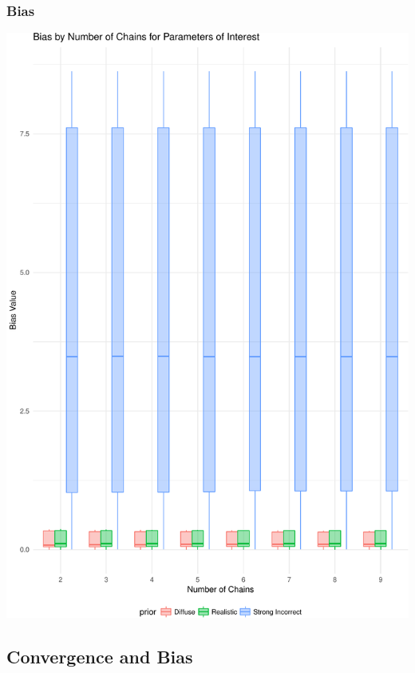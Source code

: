 \documentclass{beamer}
\begin{document}
\begin{frame}
	\frametitle{Bias}
	\begin{center}
		\includegraphics[scale=.30]{full_box_bias.pdf}
	\end{center}
\end{frame}



\subsection{Convergence and Bias}
\end{document}
